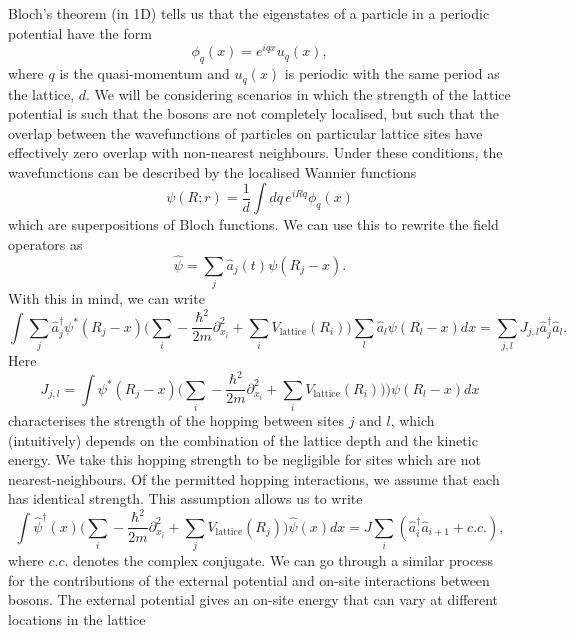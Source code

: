 \documentclass[a4paper,10pt]{article}
\begin{document}
Bloch's theorem (in 1D) tells us that the eigenstates of a particle in a periodic potential have the form
\begin{equation}
 \phi_q(x)=e^{iqx}u_{q}(x),
\end{equation}
where $q$ is the quasi-momentum and $u_q(x)$ is periodic with the same period as the lattice, $d$. We will be considering scenarios in which the strength of the lattice potential
is such that the bosons are not completely localised, but such that the overlap between the wavefunctions of particles on particular lattice sites have effectively zero overlap 
with non-nearest neighbours. Under these conditions, the wavefunctions can be described by the localised Wannier functions
\begin{equation}
\psi(R;r)=\frac{1}{d}\int dq\, e^{iRq}\phi_q(x)
\end{equation}
which are superpositions of Bloch functions. We can use this to rewrite the field operators as 
\begin{equation}
 \hat{\psi}=\sum_j \hat{a}_{j}(t)\psi(R_j-x).
\end{equation}
With this in mind, we can write
\begin{equation}
 \int  \sum_j\hat{a}_j^{\dagger}\psi^{*}(R_j-x) \bigg(  \sum_{i}-\frac{\hbar^{2}}{2m}  \partial_{x_{i}}^2+\sum_{i}V_{\text{lattice}}(R_{i}) 
 \bigg)  \sum_l  \hat{a}_l\psi(R_l-x)dx=\sum_{j,l} J_{j,l}\hat{a}_{j}^{\dagger}\hat{a}_l.
\end{equation}
Here
\begin{equation}
 J_{j,l}=\int  \psi^{*}(R_j-x) \bigg(  \sum_{i}-\frac{\hbar^{2}}{2m}  \partial_{x_{i}}^2+\sum_{i}V_{\text{lattice}}(R_{i}))  \bigg)  \psi(R_l-x)dx
\end{equation}
characterises the strength of the hopping between sites $j$ and $l$, which (intuitively) depends on the combination of the lattice depth and the kinetic energy. We take this hopping strength to be negligible
for sites which are not nearest-neighbours. Of the permitted hopping interactions, we assume that each has identical strength. This assumption allows us to write
\begin{equation}
 \int  \hat{\psi}^{\dagger}(x) \bigg(  \sum_{i}-\frac{\hbar^{2}}{2m}  \partial_{x_{i}}^2+\sum_{j}V_{\text{lattice}}(R_{j})  \bigg)    \hat{\psi}(x)dx=J\sum_{i}(\hat{a}^\dagger_{i}\hat{a}_{i+1}+c.c.),
\end{equation}
where $c.c.$ denotes the complex conjugate.
We can go through a similar process for the contributions of the external potential and on-site interactions between bosons. The external potential gives an on-site energy that can vary
at different locations in the lattice
\end{document}
